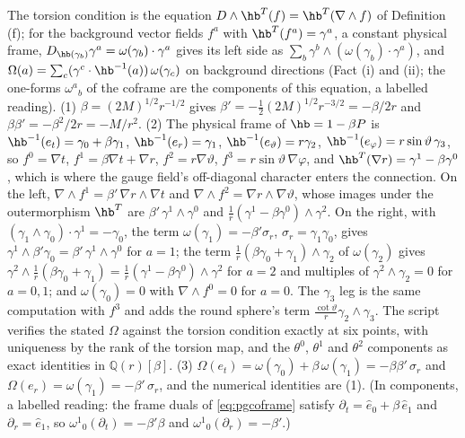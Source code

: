 The torsion condition is the equation $D\wedge\hb^{T}(f) = \hb^{T}(\nabla\wedge f)$ of Definition (f); for the background vector fields $f^a$ with $\hb^{T}(f^a) = \gamma^a$, a constant physical frame, $D_{\hb(\gamma_b)}\gamma^a = \omega(\gamma_b)\cdot\gamma^a$ gives its left side as $\sum_b \gamma^b\wedge(\omega(\gamma_b)\cdot\gamma^a)$, and $\Omega(a) = \sum_c (\gamma^c\cdot\hb^{-1}(a))\,\omega(\gamma_c)$ on background directions (Fact (i) and (ii); the one-forms $\omega^a{}_b$ of the coframe are the components of this equation, a labelled reading). (1) $\beta = (2M)^{1/2} r^{-1/2}$ gives $\beta' = -\tfrac12 (2M)^{1/2} r^{-3/2} = -\beta/2r$ and $\beta\beta' = -\beta^2/2r = -M/r^2$. (2) The physical frame of $\hb = 1 - \beta P$ is $\hb^{-1}(e_t) = \gamma_0 + \beta\gamma_1$, $\hb^{-1}(e_r) = \gamma_1$, $\hb^{-1}(e_\vartheta) = r\gamma_2$, $\hb^{-1}(e_\varphi) = r\sin\vartheta\,\gamma_3$, so $f^0 = \nabla t$, $f^1 = \beta\nabla t + \nabla r$, $f^2 = r\nabla\vartheta$, $f^3 = r\sin\vartheta\,\nabla\varphi$, and $\hb^{T}(\nabla r) = \gamma^1 - \beta\gamma^0$, which is where the gauge field's off-diagonal character enters the connection. On the left, $\nabla\wedge f^1 = \beta'\,\nabla r\wedge\nabla t$ and $\nabla\wedge f^2 = \nabla r\wedge\nabla\vartheta$, whose images under the outermorphism $\hb^{T}$ are $\beta'\,\gamma^1\wedge\gamma^0$ and $\tfrac1r(\gamma^1 - \beta\gamma^0)\wedge\gamma^2$. On the right, with $(\gamma_1\wedge\gamma_0)\cdot\gamma^1 = -\gamma_0$, the term $\omega(\gamma_1) = -\beta'\sigma_r$, $\sigma_r = \gamma_1\gamma_0$, gives $\gamma^1\wedge\beta'\gamma_0 = \beta'\,\gamma^1\wedge\gamma^0$ for $a = 1$; the term $\tfrac1r(\beta\gamma_0 + \gamma_1)\wedge\gamma_2$ of $\omega(\gamma_2)$ gives $\gamma^2\wedge\tfrac1r(\beta\gamma_0 + \gamma_1) = \tfrac1r(\gamma^1 - \beta\gamma^0)\wedge\gamma^2$ for $a = 2$ and multiples of $\gamma^2\wedge\gamma_2 = 0$ for $a = 0, 1$; and $\omega(\gamma_0) = 0$ with $\nabla\wedge f^0 = 0$ for $a = 0$. The $\gamma_3$ leg is the same computation with $f^3$ and adds the round sphere's term $\tfrac{\cot\vartheta}{r}\gamma_2\wedge\gamma_3$. The script verifies the stated $\Omega$ against the torsion condition exactly at six points, with uniqueness by the rank of the torsion map, and the $\theta^0$, $\theta^1$ and $\theta^2$ components as exact identities in $\mathbb{Q}(r)[\beta]$. (3) $\Omega(e_t) = \omega(\gamma_0) + \beta\,\omega(\gamma_1) = -\beta\beta'\,\sigma_r$ and $\Omega(e_r) = \omega(\gamma_1) = -\beta'\,\sigma_r$, and the numerical identities are (1). (In components, a labelled reading: the frame duals of \eqref{eq:pgcoframe} satisfy $\partial_t = \hat e_0 + \beta\,\hat e_1$ and $\partial_r = \hat e_1$, so $\omega^1{}_0(\partial_t) = -\beta'\beta$ and $\omega^1{}_0(\partial_r) = -\beta'$.)
